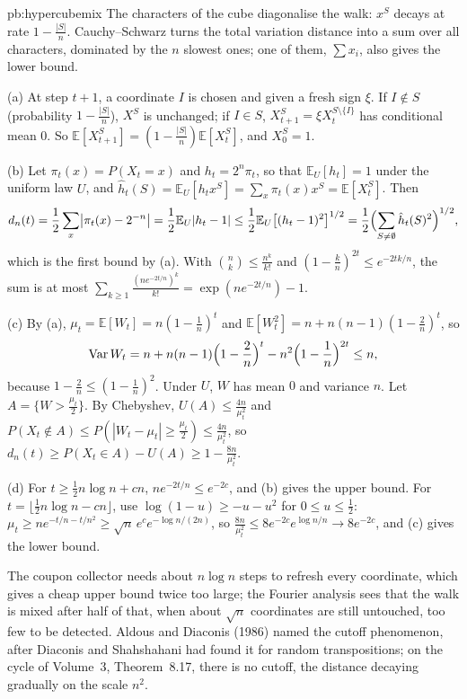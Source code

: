 \begin{solution}{pb:hypercubemix}
\idea The characters of the cube diagonalise the walk: $x^S$ decays at rate $1-\frac{|S|}n$. Cauchy--Schwarz turns the total variation distance
into a sum over all characters, dominated by the $n$ slowest ones; one of them, $\sum x_i$, also gives the lower bound.

\writeup (a) At step $t+1$, a coordinate $I$ is chosen and given a fresh sign $\xi$. If $I\notin S$ (probability $1-\frac{|S|}n$), $X^S$ is unchanged; if
$I\in S$, $X_{t+1}^S=\xi X_t^{S\setminus\{I\}}$ has conditional mean $0$. So $\mathbb E[X_{t+1}^S]=(1-\frac{|S|}n)\mathbb E[X_t^S]$, and $X_0^S=1$.

(b) Let $\pi_t(x)=P(X_t=x)$ and $h_t=2^n\pi_t$, so that $\mathbb E_U[h_t]=1$ under the uniform law $U$, and $\hat h_t(S)=\mathbb E_U[h_tx^S]=\sum_x\pi_t(x)x^S=\mathbb E[X_t^S]$.
Then
\[
d_n(t)=\frac12\sum_x\bigl|\pi_t(x)-2^{-n}\bigr|=\frac12\mathbb E_U|h_t-1|\le\frac12\mathbb E_U\bigl[(h_t-1)^2\bigr]^{1/2}=\frac12\Bigl(\sum_{S\ne\emptyset}\hat h_t(S)^2\Bigr)^{1/2},
\]
which is the first bound by (a). With $\binom nk\le\frac{n^k}{k!}$ and $(1-\frac kn)^{2t}\le e^{-2tk/n}$, the sum is at most $\sum_{k\ge1}\frac{(ne^{-2t/n})^k}{k!}=\exp(ne^{-2t/n})-1$.

(c) By (a), $\mu_t=\mathbb E[W_t]=n(1-\frac1n)^t$ and $\mathbb E[W_t^2]=n+n(n-1)(1-\frac2n)^t$, so
\[
\operatorname{Var}W_t=n+n(n-1)\Bigl(1-\frac2n\Bigr)^t-n^2\Bigl(1-\frac1n\Bigr)^{2t}\le n,
\]
because $1-\frac2n\le(1-\frac1n)^2$. Under $U$, $W$ has mean $0$ and variance $n$. Let $A=\{W>\frac{\mu_t}2\}$. By Chebyshev, $U(A)\le\frac{4n}{\mu_t^2}$ and
$P(X_t\notin A)\le P(|W_t-\mu_t|\ge\frac{\mu_t}2)\le\frac{4n}{\mu_t^2}$, so $d_n(t)\ge P(X_t\in A)-U(A)\ge1-\frac{8n}{\mu_t^2}$.

(d) For $t\ge\frac12n\log n+cn$, $ne^{-2t/n}\le e^{-2c}$, and (b) gives the upper bound. For $t=\lfloor\frac12n\log n-cn\rfloor$, use $\log(1-u)\ge-u-u^2$ for
$0\le u\le\frac12$: $\mu_t\ge ne^{-t/n-t/n^2}\ge\sqrt n\,e^ce^{-\log n/(2n)}$, so $\frac{8n}{\mu_t^2}\le8e^{-2c}e^{\log n/n}\to8e^{-2c}$, and (c) gives the lower bound.

\leads The coupon collector needs about $n\log n$ steps to refresh every coordinate, which gives a cheap upper bound twice too large;
the Fourier analysis sees that the walk is mixed after half of that, when about $\sqrt n$ coordinates are still untouched, too few to be
detected. Aldous and Diaconis (1986) named the cutoff phenomenon, after Diaconis and Shahshahani had found it for random
transpositions; on the cycle of Volume~3, Theorem~8.17, there is no cutoff, the distance decaying gradually on the scale $n^2$.
\end{solution}

